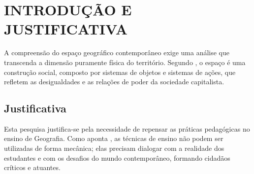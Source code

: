 \chapter{INTRODUÇÃO E JUSTIFICATIVA}

A compreensão do espaço geográfico contemporâneo exige uma análise que transcenda a dimensão puramente física do território. Segundo \cite{milton-ne}, o espaço é uma construção social, composto por sistemas de objetos e sistemas de ações, que refletem as desigualdades e as relações de poder da sociedade capitalista.

\section*{Justificativa}
Esta pesquisa justifica-se pela necessidade de repensar as práticas pedagógicas no ensino de Geografia. Como aponta \cite{tec-ensi-pqn}, as técnicas de ensino não podem ser utilizadas de forma mecânica; elas precisam dialogar com a realidade dos estudantes e com os desafios do mundo contemporâneo, formando cidadãos críticos e atuantes.